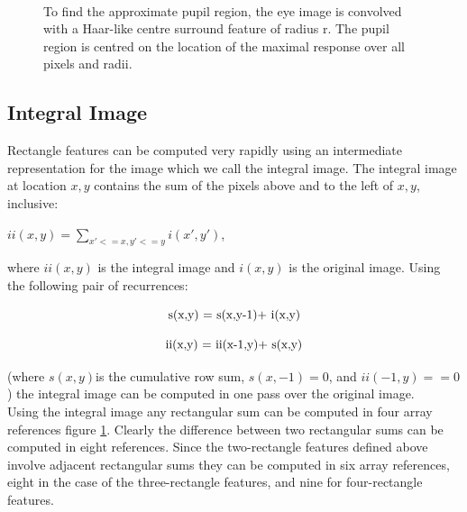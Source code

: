 \begin{figure}[]
\begin{dBox}
\centering
  \mbox{
   }
   \caption{ To find the approximate pupil region, the eye image is convolved with a Haar-like centre surround feature of radius r. The pupil region is centred on the location of the maximal response over all pixels and radii. \cite{ViolaAndJones2001}
 \label{fig:IntegralFig} }   
\end{dBox}   
\end{figure}


\subsection{Integral Image} 
Rectangle features can be computed very rapidly using an intermediate representation for the image which we call the integral image. The integral image at location $x, y$ contains the sum of the pixels above and to the left of $x, y$, inclusive: \\
\begin{center}
$ii(x,y)=\sum\limits_{x'<=x,y'<= y}i(x', y')$,
\end{center}
where $ii(x,y)$ is the integral image and $i(x,y)$ is the original image. Using the following pair of recurrences:
\begin{center}
	\begin{equation}
	$s(x,y) = s(x,y-1)+ i(x,y)$
	\end{equation}

	\begin{equation}
	$ii(x,y) = ii(x-1,y)+ s(x,y)$
	\end{equation}

\end{center}
(where $ s(x,y) $is the cumulative row sum, $s(x, -1) = 0$, and $ii(-1, y) == 0$) the integral image can be computed in one pass over the original image. \\
Using the integral image any rectangular sum can be computed in four array references figure \ref{fig:IntegralFig}. Clearly the difference between two rectangular sums can be computed in eight references. Since the two-rectangle features defined above involve adjacent rectangular sums they can be computed in six array references, eight in the case of the three-rectangle features, and nine for four-rectangle features.\cite{ViolaAndJones2001}

